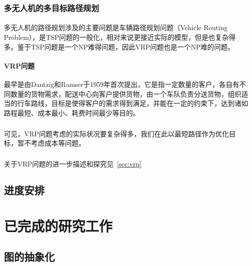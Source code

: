 \documentclass[UTF8,a4paper]{ctexart}
\begin{document}
\subsubsection{多无人机的多目标路径规划}
\paragraph{}多无人机的路径规划涉及的主要问题是车辆路径规划问题（Vehicle Routing Problem），是TSP问题的一般化，相对来说更接近实际的模型，但是也复杂得多。鉴于TSP问题是一个NP难得问题，因此VRP问题也是一个NP难的问题。

\paragraph{VRP问题}最早是由Dantzig和Ramser于1959年首次提出，它是指一定数量的客户，各自有不同数量的货物需求，配送中心向客户提供货物，由一个车队负责分送货物，组织适当的行车路线，目标是使得客户的需求得到满足，并能在一定的约束下，达到诸如路程最短、成本最小、耗费时间最少等目的。
\subparagraph{}可见，VRP问题考虑的实际状况要复杂得多，我们在此以最短路径作为优化目标，暂不考虑成本等问题。
\subparagraph{}关于VRP问题的进一步描述和探究见~\ref{sec:vrp}


\subsection{进度安排}

\section{已完成的研究工作}

\subsection{图的抽象化}
\end{document}
